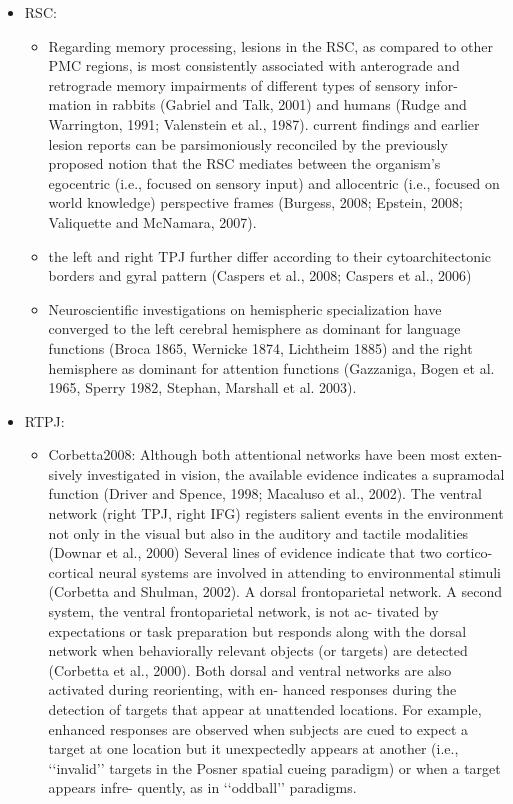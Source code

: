 \documentclass{article} %
\begin{document}
\begin{itemize}
\item RSC:
  \begin{itemize}
\item
Regarding memory processing, lesions in the RSC, as compared to other PMC regions, is most consistently associated with anterograde and retrograde memory impairments of different types of sensory infor- mation in rabbits (Gabriel and Talk, 2001) and humans (Rudge and Warrington, 1991; Valenstein et al., 1987).
current findings and earlier lesion reports can be parsimoniously reconciled by the previously proposed notion that the RSC mediates between the organism's egocentric (i.e., focused on sensory input) and allocentric (i.e., focused on world knowledge) perspective frames (Burgess, 2008; Epstein, 2008; Valiquette and McNamara, 2007).

\item
the left and right TPJ further differ according to their cytoarchitectonic borders and gyral pattern (Caspers et al., 2008; Caspers et al., 2006)

\item
Neuroscientific investigations on hemispheric specialization have converged to the left cerebral hemisphere as dominant for language functions (Broca 1865, Wernicke 1874, Lichtheim 1885) and the right hemisphere as dominant for attention functions (Gazzaniga, Bogen et al. 1965, Sperry 1982, Stephan, Marshall et al. 2003). 
  \end{itemize}


  \item
    RTPJ:
    \begin{itemize}
\item
Corbetta2008:
Although both attentional networks have been most exten- sively investigated in vision, the available evidence indicates a supramodal function (Driver and Spence, 1998; Macaluso et al., 2002). The ventral network (right TPJ, right IFG) registers salient events in the environment not only in the visual but also in the auditory and tactile modalities (Downar et al., 2000)
Several lines of evidence indicate that two cortico-cortical neural systems are involved in attending to environmental stimuli (Corbetta and Shulman, 2002). A dorsal frontoparietal network. A second system, the ventral frontoparietal network, is not ac- tivated by expectations or task preparation but responds along with the dorsal network when behaviorally relevant objects (or targets) are detected (Corbetta et al., 2000). Both dorsal and ventral networks are also activated during reorienting, with en- hanced responses during the detection of targets that appear at unattended locations. For example, enhanced responses are observed when subjects are cued to expect a target at one location but it unexpectedly appears at another (i.e., ‘‘invalid’’ targets in the Posner spatial cueing paradigm)
or when a target appears infre- quently, as in ‘‘oddball’’ paradigms.


\end{itemize}
\end{itemize}
\end{document}
